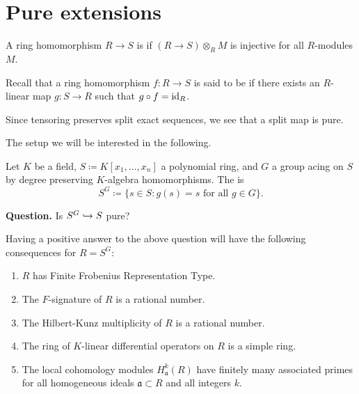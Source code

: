 \documentclass[12pt]{article}
\begin{document}
\section{Pure extensions}

\begin{defn}
	A ring homomorphism $R \to S$ is  if $(R \to S) \otimes_{R} M$ is injective for all $R$-modules $M$. 
\end{defn}

\begin{ex}
	Recall that a ring homomorphism $f : R \to S$ is said to be  if there exists an $R$-linear map $g : S \to R$ such that $g \circ f = \operatorname{id}_{R}$. 

	Since tensoring preserves split exact sequences, we see that a split map is pure.
\end{ex}

The setup we will be interested in the following. 

\begin{tcolorbox}
	Let $K$ be a field, $S \coloneqq K[x_{1}, \ldots, x_{n}]$ a polynomial ring, and $G$ a group acing on $S$ by degree preserving $K$-algebra homomorphisms. The  is
	\begin{equation*} 
		S^{G} \coloneqq \{s \in S : g(s) = s \text{ for all } g \in G\}.
	\end{equation*}
\end{tcolorbox}

\textbf{Question.} Is $S^{G} \hookrightarrow S$ pure?

\begin{rem} \label{rem:consequences-of-purity}
	Having a positive answer to the above question will have the following consequences for $R = S^{G}$:
	\begin{enumerate}[label=(\alph*)]
		\item $R$ has Finite Frobenius Representation Type. 
		\item The $F$-signature of $R$ is a rational number.
		\item The Hilbert-Kunz multiplicity of $R$ is a rational number.
		\item The ring of $K$-linear differential operators on $R$ is a simple ring.
		\item The local cohomology modules $H_{\mathfrak{a}}^{k}(R)$ have finitely many associated primes for all homogeneous ideals $\mathfrak{a} \subset R$ and all integers $k$.
	\end{enumerate}
\end{rem}
\end{document}
